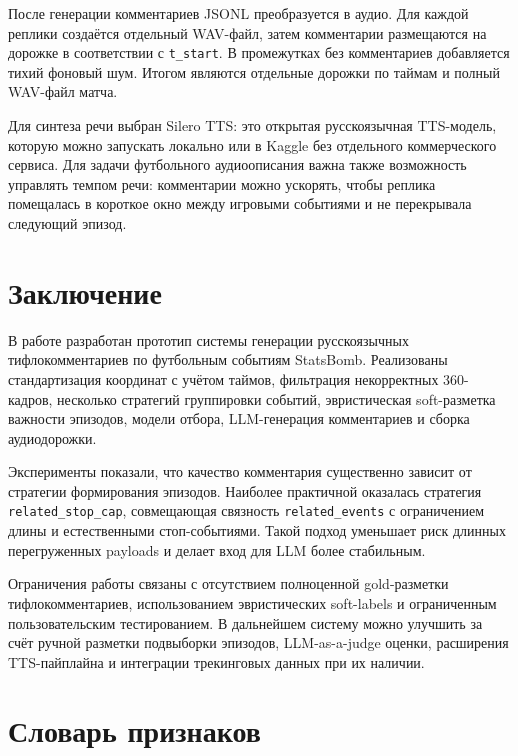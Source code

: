 \documentclass[a4paper,14pt]{extarticle}
\numberwithin{table}{section}
\numberwithin{figure}{section}
\numberwithin{equation}{section}
\begin{document}
После генерации комментариев JSONL преобразуется в аудио. Для каждой реплики создаётся отдельный WAV-файл, затем комментарии размещаются на дорожке в соответствии с \texttt{t\_start}. В промежутках без комментариев добавляется тихий фоновый шум. Итогом являются отдельные дорожки по таймам и полный WAV-файл матча.

Для синтеза речи выбран Silero TTS: это открытая русскоязычная TTS-модель, которую можно запускать локально или в Kaggle без отдельного коммерческого сервиса. Для задачи футбольного аудиоописания важна также возможность управлять темпом речи: комментарии можно ускорять, чтобы реплика помещалась в короткое окно между игровыми событиями и не перекрывала следующий эпизод.

\section{Заключение}

В работе разработан прототип системы генерации русскоязычных тифлокомментариев по футбольным событиям StatsBomb. Реализованы стандартизация координат с учётом таймов, фильтрация некорректных 360-кадров, несколько стратегий группировки событий, эвристическая soft-разметка важности эпизодов, модели отбора, LLM-генерация комментариев и сборка аудиодорожки.

Эксперименты показали, что качество комментария существенно зависит от стратегии формирования эпизодов. Наиболее практичной оказалась стратегия \texttt{related\_stop\_cap}, совмещающая связность \texttt{related\_events} с ограничением длины и естественными стоп-событиями. Такой подход уменьшает риск длинных перегруженных payloads и делает вход для LLM более стабильным.

Ограничения работы связаны с отсутствием полноценной gold-разметки тифлокомментариев, использованием эвристических soft-labels и ограниченным пользовательским тестированием. В дальнейшем систему можно улучшить за счёт ручной разметки подвыборки эпизодов, LLM-as-a-judge оценки, расширения TTS-пайплайна и интеграции трекинговых данных при их наличии.

\newpage
\printbibliography[heading=bibintoc]

\newpage
\appendix
\renewcommand{\thesection}{\Alph{section}}
\renewcommand{\thetable}{\Alph{section}.\arabic{table}}
\renewcommand{\thefigure}{\Alph{section}.\arabic{figure}}

\section{Словарь признаков}\label{app:features}
\end{document}
